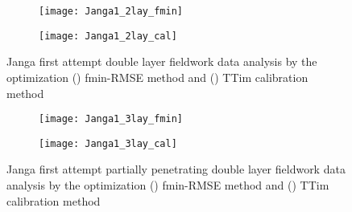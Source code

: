 \begin{figure}[h!]
	\centering
	\begin{subfigure}[b]{0.65\linewidth}
		\centering\texttt{[image: Janga1\_2lay\_fmin]}
		\captionsetup{justification=centering}		
		\caption{\label{fig:Janga1_2lay_fmin}}
		\end{subfigure}\vfill
	\begin{subfigure}[b]{0.65\linewidth}
		\centering\texttt{[image: Janga1\_2lay\_cal]}
		\captionsetup{justification=centering}		
		\caption{\label{fig:Janga1_2lay_cal}}
		\end{subfigure}
	\captionsetup{justification=centering}	
	\caption{Janga first attempt double layer fieldwork data analysis by the optimization () fmin-RMSE method and () TTim calibration method} 
	\label{fig:Janga1_2lay_analysis}
\end{figure} 

\begin{figure}[h!]
	\centering
	\begin{subfigure}[b]{0.65\linewidth}
		\centering\texttt{[image: Janga1\_3lay\_fmin]}
		\captionsetup{justification=centering}		
		\caption{\label{fig:Janga1_3lay_fmin}}
		\end{subfigure}\vfill
	\begin{subfigure}[b]{0.65\linewidth}
		\centering\texttt{[image: Janga1\_3lay\_cal]}
		\captionsetup{justification=centering}		
		\caption{\label{fig:Janga1_3lay_cal}}
		\end{subfigure}
	\captionsetup{justification=centering}	
	\caption{Janga first attempt partially penetrating double layer fieldwork data analysis by the optimization () fmin-RMSE method and () TTim calibration method} 
	\label{fig:Janga1_3lay_analysis}
\end{figure} 

\clearpage

